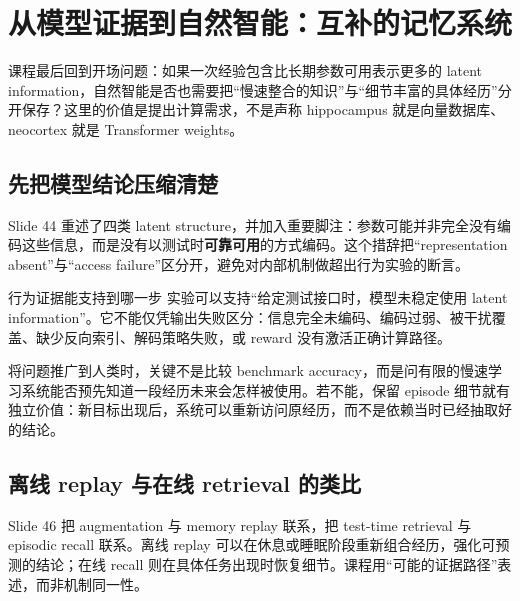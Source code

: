 \section{从模型证据到自然智能：互补的记忆系统}

课程最后回到开场问题：如果一次经验包含比长期参数可用表示更多的 latent information，自然智能是否也需要把“慢速整合的知识”与“细节丰富的具体经历”分开保存？这里的价值是提出计算需求，不是声称 hippocampus 就是向量数据库、neocortex 就是 Transformer weights。

\subsection{先把模型结论压缩清楚}

Slide 44 重述了四类 latent structure，并加入重要脚注：参数可能并非完全没有编码这些信息，而是没有以测试时\textbf{可靠可用}的方式编码。这个措辞把“representation absent”与“access failure”区分开，避免对内部机制做超出行为实验的断言。


\begin{importantbox}{行为证据能支持到哪一步}
实验可以支持“给定测试接口时，模型未稳定使用 latent information”。它不能仅凭输出失败区分：信息完全未编码、编码过弱、被干扰覆盖、缺少反向索引、解码策略失败，或 reward 没有激活正确计算路径。
\end{importantbox}


将问题推广到人类时，关键不是比较 benchmark accuracy，而是问有限的慢速学习系统能否预先知道一段经历未来会怎样被使用。若不能，保留 episode 细节就有独立价值：新目标出现后，系统可以重新访问原经历，而不是依赖当时已经抽取好的结论。

\subsection{离线 replay 与在线 retrieval 的类比}

Slide 46 把 augmentation 与 memory replay 联系，把 test-time retrieval 与 episodic recall 联系。离线 replay 可以在休息或睡眠阶段重新组合经历，强化可预测的结论；在线 recall 则在具体任务出现时恢复细节。课程用“可能的证据路径”表述，而非机制同一性。


